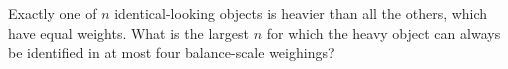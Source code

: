 Exactly one of $n$ identical-looking objects is heavier than all the others, which have equal weights. What is the largest $n$ for which the heavy object can always be identified in at most four balance-scale weighings?
